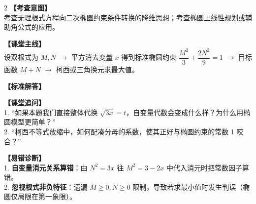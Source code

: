 \documentclass[11pt,a4paper]{ctexart}
\begin{document}
\vspace{0.8em}
\par{}
\vspace{0.8em}

\begin{minipage}[t]{0.7\textwidth}
  \vspace{0pt}
  \qFourStem
  \qFourOptions
\end{minipage}
\hfill
\begin{minipage}[t]{0.26\textwidth}
  \vspace{0pt}
  \hfill
  \qFourFigure[0.85]
\end{minipage}

\vspace{0.8em}

\begin{paracol}{2}
  \textbf{【考查意图】}\\
  考查无理根式方程向二次椭圆约束条件转换的降维思想；考查椭圆上线性规划或辅助角公式的应用。
  
  \textbf{【课堂主线】}\\
  设双根式为 \(M, N\) \(\to\) 平方消去变量 \(x\) 得到标准椭圆约束 \(\dfrac{M^2}{3}+\dfrac{2N^2}{9}=1\) \(\to\) 目标函数 \(M+N\) \(\to\) 柯西或三角换元求最大值。
  
  \textbf{【标准解答】}\\
  \qFourSolution
  
  \textbf{【课堂追问】}\\
  1. “如果本题我们直接整体代换 \(\sqrt{3x} = t\)，自变量代数会变成什么样？为什么用椭圆模型更简单？”\\
  2. “柯西不等式放缩中，如何配凑分母的系数，使其正好与椭圆约束的常数 1 咬合？”
  
  \switchcolumn
  \textbf{【易错诊断】}\\
  1. \textbf{自变量消元关系算错}：由 \(N^2 = 3x\) 往 \(M^2 = 3 - 2x\) 中代入消元时把常数因子算错。\\
  2. \textbf{忽视根式非负特征}：遗漏 \(M \geqslant 0, N \geqslant 0\) 限制，导致若求最小值时发生判误（椭圆仅局限在第一象限）。
\end{paracol}

\vspace{0.8em}
\par{}
\vspace{0.8em}

\newpage

{\small
\qFiveStem
}
\end{document}
